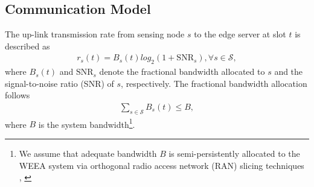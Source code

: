 \documentclass[lettersize,journal]{IEEEtran}
\theoremstyle{custom}
\begin{document}




\subsection{Communication Model}
The up-link transmission rate from sensing node $s$ to the edge server at slot $t$ is described as
\begin{align}
    r_{s}(t) = B_s(t) log_2\left(1 + \mathrm{SNR}_s \right), \forall s \in \mathcal{S}, 
\end{align}
where $B_s(t)$ and $\mathrm{SNR}_s$ denote the fractional bandwidth allocated to $s$ and the signal-to-noise ratio (SNR) of $s$, respectively. The fractional bandwidth allocation follows
\begin{align}\label{bandwidth_cons}
    \sum_{s \in \mathcal{S}}B_s(t) \leq B, 
\end{align}
where $B$ is the system bandwidth\footnote{We assume that adequate bandwidth $B$ is semi-persistently allocated to the WEEA system via orthogonal radio access network (RAN) slicing techniques \cite{}, \cite{}}. 
\end{document}
